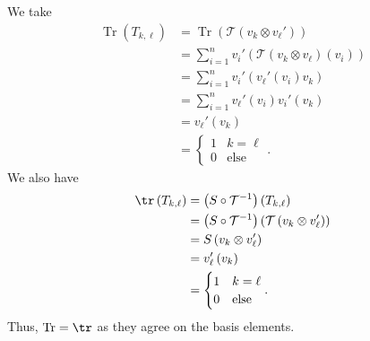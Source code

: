 \documentclass[10pt]{mypackage}
\begin{document}
  We take
  \begin{align*}
    \operatorname{Tr}\left(T_{k,\ell}\right) &= \operatorname{Tr}\left(\mathcal{T}\left(v_{k}\otimes v_{\ell}'\right)\right)\\
                                             &= \sum_{i=1}^{n}v_{i}'\left(\mathcal{T}\left(v_{k}\otimes v_{\ell}\right)\left(v_i\right)\right)\\
                                             &= \sum_{i=1}^{n}v_{i}'\left(v_{\ell}'\left(v_i\right) v_k\right)\\
                                             &= \sum_{i=1}^{n}v_{\ell}'\left(v_i\right)v_{i}'\left(v_k\right)\\
                                             &= v_{\ell}'\left(v_k\right)\\
                                             &= \begin{cases}
                                               1 & k = \ell\\
                                               0 & \text{else}
                                             \end{cases}.
  \end{align*}
  We also have
  \begin{align*}
    \tr\left(T_{k,\ell}\right) &= \left(S\circ \mathcal{T}^{-1}\right)\left(T_{k,\ell}\right)\\
                               &= \left(S\circ \mathcal{T}^{-1}\right)\left(\mathcal{T}\left(v_{k}\otimes v_{\ell}'\right)\right)\\
                               &= S\left(v_{k}\otimes v_{\ell}'\right)\\
                               &= v_{\ell}'\left(v_k\right)\\
                               &= \begin{cases}
                                 1 & k = \ell\\
                                 0 & \text{else}
                               \end{cases}.
  \end{align*}
  Thus, $\operatorname{Tr} = \tr$ as they agree on the basis elements.\newline
\end{document}
